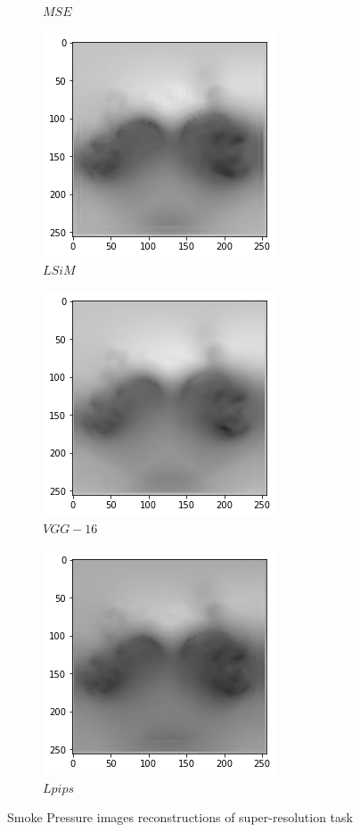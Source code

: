 \documentclass[a4paper,12pt,twoside]{report}
\begin{document}
\begin{figure}
\begin{subfigure}{0.32\textwidth}
		\caption{$MSE$}
	\end{subfigure}
	\begin{subfigure}{0.32\textwidth}
		\centering
		\includegraphics[scale=0.4]{superresolution/pressure_lsim.png}
		\caption{$LSiM$}
	\end{subfigure}
	\begin{subfigure}{0.32\textwidth}
		\centering
		\includegraphics[scale=0.4]{superresolution/pressure_vgg.png}
		\caption{$VGG-16$}
	\end{subfigure}
	\begin{subfigure}{0.32\textwidth}
		\centering
		\includegraphics[scale=0.4]{superresolution/pressure_lpips.png}
		\caption{$Lpips$}
	\end{subfigure}
	\caption{Smoke Pressure images reconstructions of super-resolution task}
	\label{super pressure}
\end{figure}
\end{document}
